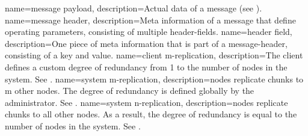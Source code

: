 {
    name={message payload},
    description={Actual data of a \gls{message} (see ).}
}
{
    name={message header},
    description={Meta information of a \gls{message} that define operating parameters, consisting of multiple \glspl{header-field}.}
}
{
    name={header field},
    description={One piece of meta information that is part of a \gls{message-header}, consisting of a key and value.}
}
{
    name={client m-replication},
    description={The \gls{client} defines a custom degree of redundancy from 1 to the number of \glspl{node} in the system. See .}
}
{
    name={system m-replication},
    description={\Glspl{node} replicate \glspl{chunk} to m other \glspl{node}. The degree of redundancy is defined globally by the administrator. See .}
}
{
    name={system n-replication},
    description={\Glspl{node} replicate \glspl{chunk} to all other \glspl{node}. As a result, the degree of redundancy is equal to the number of \glspl{node} in the system. See .}
}